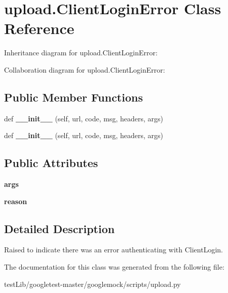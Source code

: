 \hypertarget{classupload_1_1ClientLoginError}{}\section{upload.\+Client\+Login\+Error Class Reference}
\label{classupload_1_1ClientLoginError}


Inheritance diagram for upload.\+Client\+Login\+Error\+:


Collaboration diagram for upload.\+Client\+Login\+Error\+:
\subsection*{Public Member Functions}
\begin{DoxyCompactItemize}
\item 
\mbox{\label{classupload_1_1ClientLoginError_a1e590616c2976d881e155958cedbbe47}} 
def {\bfseries \+\_\+\+\_\+init\+\_\+\+\_\+} (self, url, code, msg, headers, args)
\item 
\mbox{\label{classupload_1_1ClientLoginError_a1e590616c2976d881e155958cedbbe47}} 
def {\bfseries \+\_\+\+\_\+init\+\_\+\+\_\+} (self, url, code, msg, headers, args)
\end{DoxyCompactItemize}
\subsection*{Public Attributes}
\begin{DoxyCompactItemize}
\item 
\mbox{\label{classupload_1_1ClientLoginError_ac300a0b034b2bc64cedc51e09fb6d663}} 
{\bfseries args}
\item 
\mbox{\label{classupload_1_1ClientLoginError_ae0555feb182d89d1e4d7944afbfe14e5}} 
{\bfseries reason}
\end{DoxyCompactItemize}


\subsection{Detailed Description}
\begin{DoxyVerb}Raised to indicate there was an error authenticating with ClientLogin.\end{DoxyVerb}
 

The documentation for this class was generated from the following file\+:\begin{DoxyCompactItemize}
\item 
test\+Lib/googletest-\/master/googlemock/scripts/upload.\+py\end{DoxyCompactItemize}
